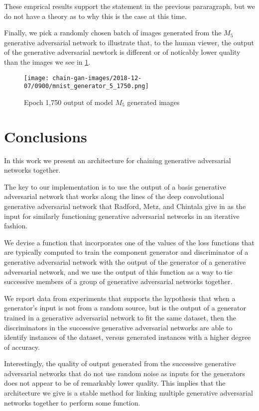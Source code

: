 \documentclass[conference]{IEEEtran}
\begin{document}
These emprical results support the statement in the previous pararagraph, but we
do not have a theory as to why this is the case at this time.

Finally, we pick a randomly chosen batch of images generated from the $M_{5}$
generative adversarial network to illustrate that, to the human viewer, the
output of the generative adversarial newtork is different or of noticably lower
quality than the images we see in \ref{trainedBaseGan}.

\begin{figure}[htbp]
\centerline{\texttt{[image: chain-gan-images/2018-12-07/0900/mnist\_generator\_5\_1750.png]}}
\caption{Epoch 1,750 output of model $M_{5}$ generated images}
\label{trainedBaseGan}
\end{figure}


\section{Conclusions}

In this work we present an architecture for chaining generative adversarial
networks together.

The key to our implementation is to use the output of a basis generative
adversarial network that works along the lines of the deep convolutional
generative adversarial network that Radford, Metz, and Chintala give in
\cite{repLearnDcgan} as the input for similarly functioning generative
adversarial networks in an iterative fashion.

We devise a function that incorporates one of the values of the loss functions
that are typically computed to train the component generator and discriminator
of a generative adversarial network with the output of the generator of a
generative adversarial network, and we use the output of this function as a way
to tie successive members of a group of generative adversarial networks
together.

We report data from experiments that supports the hypothesis that when a
generator's input is not from a random source, but is the output of a generator
trained in a generative adversarial network to fit the same dataset, then the
discriminators in the successive generative adversarial networks are able to
identify instances of the dataset, versus generated instances with a higher
degree of accuracy.

Interestingly, the quality of output generated from the successive generative
adversarial networks that do not use random noise as inputs for the generators
does not appear to be of remarkably lower quality.  This implies that the
architecture we give is a stable method for linking multiple generative
adversarial networks together to perform some function.
\end{document}
